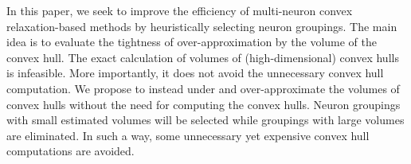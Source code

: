 \documentclass[runningheads]{llncs}
\newcommand{\prima}{\textsc{Prima}\xspace}
\newcommand{\krelu}{\textsc{kPoly}\xspace}
\begin{document}


In this paper, we seek to improve the efficiency of multi-neuron
convex relaxation-based methods by heuristically selecting neuron
groupings. The main idea is to evaluate the tightness of over-approximation
by the volume of the convex hull. The exact calculation of volumes of
(high-dimensional) convex hulls is infeasible. More importantly, it
does not avoid the unnecessary convex hull computation. We propose to
instead under and over-approximate the volumes of convex hulls
without the need for computing the convex hulls. Neuron groupings with
small estimated volumes will be selected while groupings with large
volumes are eliminated. In such a way, some unnecessary yet expensive
convex hull computations are avoided.

\end{document}
